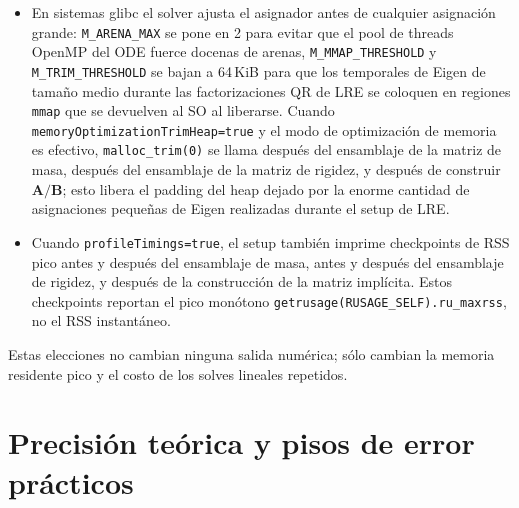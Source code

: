 \documentclass[11pt,a4paper]{article}
\newcommand{\code}[1]{\texttt{\small #1}}
\newcommand{\Kstif}{\mathbf{K}}
\newcommand{\Aimp}{\mathbf{A}}
\newcommand{\Bimp}{\mathbf{B}}
\begin{document}
\begin{itemize}
de tiempo. El solver siempre forma el laplaciano numérico usado en el diagnóstico del RHS desde
la expresión de matriz ya ensamblada $\Kstif\mathsf{V}+\mathsf{b}$. El costoso camino
\code{computeHighOrderLaplacian} que llena \code{fluxVm\_HO} sólo se corre cuando un tiempo de
salida necesita el campo de flujo, y una vez más durante el post-procesamiento final.
\item En sistemas glibc el solver ajusta el asignador antes de cualquier asignación grande:
\code{M\_ARENA\_MAX} se pone en 2 para evitar que el pool de threads OpenMP del ODE fuerce
docenas de arenas, \code{M\_MMAP\_THRESHOLD} y \code{M\_TRIM\_THRESHOLD} se bajan a 64\,KiB para
que los temporales de Eigen de tamaño medio durante las factorizaciones QR de LRE se coloquen
en regiones \code{mmap} que se devuelven al SO al liberarse. Cuando
\code{memoryOptimizationTrimHeap=true} y el modo de optimización de memoria es efectivo,
\code{malloc\_trim(0)} se llama después del ensamblaje de la matriz de masa, después del
ensamblaje de la matriz de rigidez, y después de construir $\Aimp/\Bimp$; esto libera el
padding del heap dejado por la enorme cantidad de asignaciones pequeñas de Eigen realizadas
durante el setup de LRE.
\item Cuando \code{profileTimings=true}, el setup también imprime checkpoints de RSS pico antes
y después del ensamblaje de masa, antes y después del ensamblaje de rigidez, y después de la
construcción de la matriz implícita. Estos checkpoints reportan el pico monótono
\code{getrusage(RUSAGE\_SELF).ru\_maxrss}, no el RSS instantáneo.
\end{itemize}
Estas elecciones no cambian ninguna salida numérica; sólo cambian la memoria residente pico y
el costo de los solves lineales repetidos.

\section{Precisión teórica y pisos de error prácticos}
\end{document}
